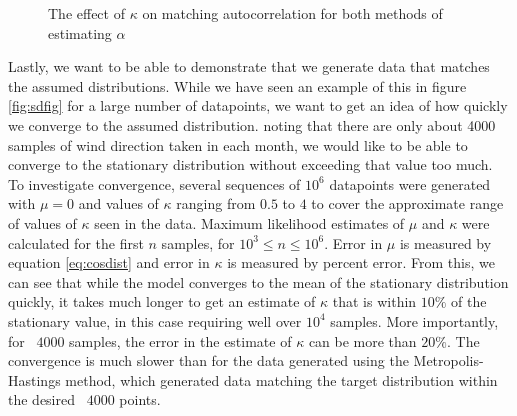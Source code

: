 \documentclass[12pt]{article}
\numberwithin{equation}{section}
\numberwithin{figure}{section}
\begin{document}
\begin{figure}[h]
\centering
{}
\caption{The effect of $\kappa$ on matching autocorrelation for both methods of estimating $\alpha$}\label{fig:matching decorr}
\end{figure}

Lastly, we want to be able to demonstrate that we generate data that matches the assumed distributions. While we have seen an example of this in figure \ref{fig:sdfig} for a large number of datapoints, we want to get an idea of how quickly we converge to the assumed distribution. noting that there are only about 4000 samples of wind direction taken in each month, we would like to be able to converge to the stationary distribution without exceeding that value too much. To investigate convergence, several sequences of $10^6$ datapoints were generated with $\mu=0$ and values of $\kappa$ ranging from $0.5$ to $4$ to cover the approximate range of values of $\kappa$ seen in the data. Maximum likelihood estimates of $\mu$ and $\kappa$ were calculated for the first $n$ samples, for $10^3 \le n \le 10^6$. Error in $\mu$ is measured by equation \ref{eq:cosdist} and error in $\kappa$ is measured by percent error. From this, we can see that while the model converges to the mean of the stationary distribution quickly, it takes much longer to get an estimate of $\kappa$ that is within $10 \%$ of the stationary value, in this case requiring well over $10^4$ samples. More importantly, for ~$4000$ samples, the error in the estimate of $\kappa$ can be more than $20 \%$. The convergence is much slower than for the data generated using the Metropolis-Hastings method, which generated data matching the target distribution within the desired ~$4000$ points. 
\end{document}
